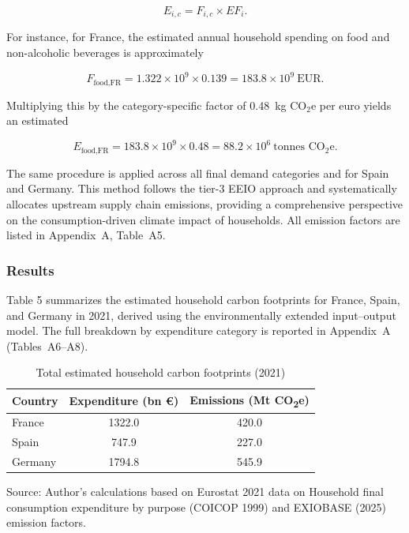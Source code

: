 \documentclass[12pt,a4paper]{article}%
\begin{document}
\begin{equation}
  E_{i,c} = F_{i,c} \times EF_i.
\end{equation}

For instance, for France, the estimated annual household spending on food and non-alcoholic beverages is approximately

\[
F_{\text{food,FR}} = 1.322 \times 10^9 \times 0.139 = 183.8 \times 10^9~\text{EUR}.
\]

Multiplying this by the category-specific factor of 0.48~kg CO$_2$e per euro yields an estimated

\[
E_{\text{food,FR}} = 183.8 \times 10^9 \times 0.48 = 88.2 \times 10^6~\text{tonnes CO}_2\text{e}.
\]

The same procedure is applied across all final demand categories and for Spain and Germany. This method follows the tier-3 EEIO approach and systematically allocates upstream supply chain emissions, providing a comprehensive perspective on the consumption-driven climate impact of households. All emission factors are listed in Appendix~A, Table~A5.

\subsubsection{Results}

Table 5 summarizes the estimated household carbon footprints for France, Spain, and Germany in 2021, derived using the environmentally extended input--output model. The full breakdown by expenditure category is reported in Appendix~A (Tables~A6--A8).

\begin{table}[h]
 \captionsetup{justification=raggedright,singlelinecheck=false} 
\caption{\small{Total estimated household carbon footprints (2021)}}
\begin{tabular}{lcc}
\toprule
\textbf\small{Country} & \textbf\small{Expenditure (bn €)} & \textbf\small{Emissions (Mt CO\textsubscript{2}e)} \\
\midrule
\small France & \small 1322.0 & \small 420.0 \\
\small Spain & \small 747.9 & \small 227.0 \\
\small Germany & \small 1794.8 & \small 545.9 \\
\bottomrule
\end{tabular}
\raggedright

\vspace{0.3cm}
\footnotesize{Source: Author's calculations based on Eurostat 2021 data on Household final consumption expenditure by purpose (COICOP 1999) and EXIOBASE (2025) emission factors.}
\end{table}
\end{document}

